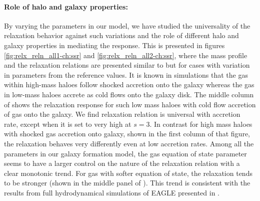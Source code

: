 \paragraph{Role of halo and galaxy properties:}
By varying the parameters in our model, we have studied the universality of the relaxation behavior against such variations and the role of different halo and galaxy properties in mediating the response. This is presented in figures \ref{fig:relx_reln_all1-ch:ssr} and \ref{fig:relx_reln_all2-ch:ssr}, where the mass profile and the relaxation relations are presented similar to  but for cases with variation in parameters from the reference values. It is known in simulations that the gas within high-mass haloes follow shocked accretion onto the galaxy whereas the gas in low-mass haloes accrete as cold flows onto the galaxy disk. The middle column of  shows the relaxation response for such low mass haloes with cold flow accretion of gas onto the galaxy. We find relaxation relation is universal with accretion rate, except when it is set to very high at $s=3$. In contrast for high mass haloes with shocked gas accretion onto galaxy, shown in the first column of that figure, the relaxation behaves very differently even at low accretion rates. Among all the parameters in our galaxy formation model, the gas equation of state parameter seems to have a larger control on the nature of the relaxation relation with a clear monotonic trend. For gas with softer equation of state, the relaxation tends to be stronger (shown in the middle panel of ). This trend is consistent with the results from full hydrodynamical simulations of EAGLE presented in .

